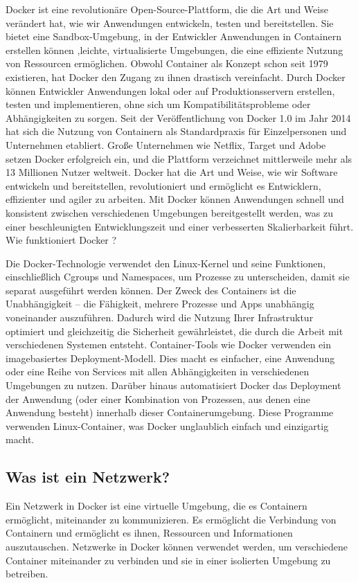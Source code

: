 Docker ist eine revolutionäre Open-Source-Plattform, die die Art und Weise verändert hat, wie wir Anwendungen entwickeln, testen und bereitstellen. Sie bietet eine Sandbox-Umgebung, in der Entwickler Anwendungen in Containern erstellen können ,leichte, virtualisierte Umgebungen, die eine effiziente Nutzung von Ressourcen ermöglichen. 
Obwohl Container als Konzept schon seit 1979 existieren, hat Docker den Zugang zu ihnen drastisch vereinfacht. Durch Docker können Entwickler Anwendungen lokal oder auf Produktionsservern erstellen, testen und implementieren, ohne sich um Kompatibilitätsprobleme oder Abhängigkeiten zu sorgen.
Seit der Veröffentlichung von Docker 1.0 im Jahr 2014 hat sich die Nutzung von Containern als Standardpraxis für Einzelpersonen und Unternehmen etabliert. Große Unternehmen wie Netflix, Target und Adobe setzen Docker erfolgreich ein, und die Plattform verzeichnet mittlerweile mehr als 13 Millionen Nutzer weltweit. 
Docker hat die Art und Weise, wie wir Software entwickeln und bereitstellen, revolutioniert und ermöglicht es Entwicklern, effizienter und agiler zu arbeiten. Mit Docker können Anwendungen schnell und konsistent zwischen verschiedenen Umgebungen bereitgestellt werden, was zu einer beschleunigten Entwicklungszeit und einer verbesserten Skalierbarkeit führt. 
Wie funktioniert Docker ?


Die Docker-Technologie verwendet den Linux-Kernel und seine Funktionen, einschließlich Cgroups und Namespaces, um Prozesse zu unterscheiden, damit sie separat ausgeführt werden können. Der Zweck des Containers ist die Unabhängigkeit – die Fähigkeit, mehrere Prozesse und Apps unabhängig voneinander auszuführen. Dadurch wird die Nutzung Ihrer Infrastruktur optimiert und gleichzeitig die Sicherheit gewährleistet, die durch die Arbeit mit verschiedenen Systemen entsteht. 
Container-Tools wie Docker verwenden ein imagebasiertes Deployment-Modell. Dies macht es einfacher, eine Anwendung oder eine Reihe von Services mit allen Abhängigkeiten in verschiedenen Umgebungen zu nutzen. Darüber hinaus automatisiert Docker das Deployment der Anwendung (oder einer Kombination von Prozessen, aus denen eine Anwendung besteht) innerhalb dieser Containerumgebung.
Diese Programme verwenden Linux-Container, was Docker unglaublich einfach und einzigartig macht.
\subsection{Was ist ein Netzwerk?}

Ein Netzwerk in Docker ist eine virtuelle Umgebung, die es Containern ermöglicht, miteinander zu kommunizieren. Es ermöglicht die Verbindung von Containern und ermöglicht es ihnen, Ressourcen und Informationen auszutauschen. Netzwerke in Docker können verwendet werden, um verschiedene Container miteinander zu verbinden und sie in einer isolierten Umgebung zu betreiben. 

